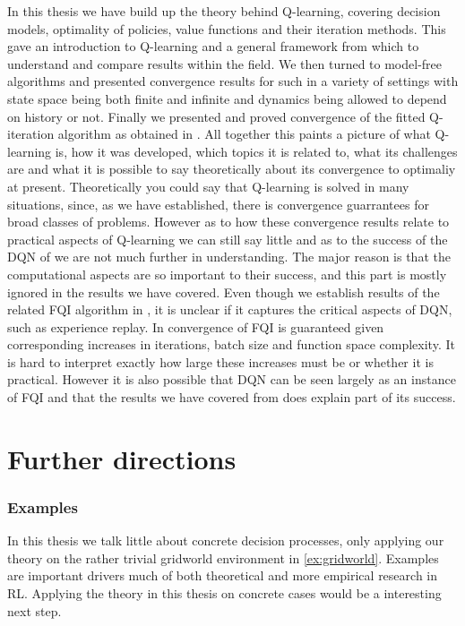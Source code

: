 In this thesis we have build up the theory behind Q-learning,
covering decision models, optimality of policies,
value functions and their iteration methods.
This gave an introduction to Q-learning 
and a general framework from which to understand
and compare results within the field.
We then turned to model-free algorithms 
and presented convergence results for such in a variety
of settings with state space being both finite and infinite and
dynamics being allowed to depend on history or not.
Finally we presented and proved convergence of the fitted Q-iteration
algorithm as obtained in .
All together this paints a picture of what Q-learning is,
how it was developed, which topics it is related to,
what its challenges are and what it is possible to
say theoretically about its convergence to optimaliy at present.
Theoretically you could say that Q-learning is solved in many situations,
since, as we have established,
there is convergence guarrantees for broad classes of problems.
However as to how these convergence results relate to practical aspects of
Q-learning we can still say little and as to the success of the DQN of
 we are not much further in understanding.
The major reason is that the computational aspects are so important to their 
success, and this part is mostly ignored in the results we have covered.
Even though we establish results of the related FQI algorithm in ,
it is unclear if it captures the critical aspects of DQN,
such as experience replay.
In  convergence of FQI is guaranteed given corresponding
increases in iterations, batch size and function space complexity.
It is hard to interpret exactly how large these increases must be
or whether it is practical.
However it is also possible that DQN can be seen largely as an instance of FQI 
and that the results we have covered from  does explain
part of its success.

\section{Further directions}
\subsubsection{Examples}
In this thesis we talk little about concrete decision processes, only
applying our theory on the rather trivial gridworld environment in
\cref{ex:gridworld}.
Examples are important drivers much of both theoretical and more empirical
research in RL.
Applying the theory in this thesis on concrete cases would be a interesting
next step.


